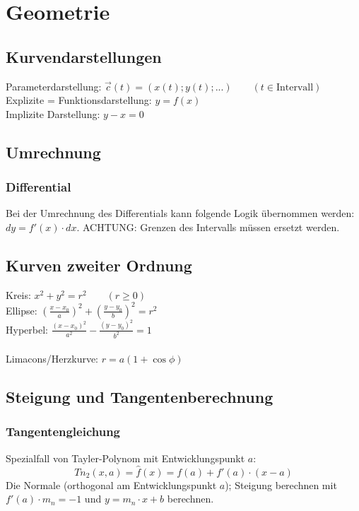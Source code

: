 \section{Geometrie}
\subsection{Kurvendarstellungen}
Parameterdarstellung: $\vec{c}(t) = (x(t); y(t); ...) \qquad (t \in \text{Intervall})$\\
Explizite = Funktionsdarstellung: $y = f(x)$\\
Implizite Darstellung: $y - x = 0$ 


\subsection{Umrechnung}

\subsubsection{Differential}
Bei der Umrechnung des Differentials kann folgende Logik übernommen werden: $dy = f'(x) \cdot dx$. ACHTUNG: Grenzen des Intervalls müssen ersetzt werden.

\subsection{Kurven zweiter Ordnung}
Kreis: $x^2 + y^2 = r^2 \qquad (r \geq 0)$\\
Ellipse: $\left(\frac{x - x_0}{a}\right)^2 + \left(\frac{y - y_0}{b}\right)^2 = r^2$\\
Hyperbel: $\frac{(x - x_0)^2}{a^2} - \frac{(y - y_0)^2}{b^2} = 1$\\
~\\
Limacons/Herzkurve: $r = a(1 + \cos\phi)$

\subsection{Steigung und Tangentenberechnung}
\subsubsection{Tangentengleichung}
Spezialfall von Tayler-Polynom mit Entwicklungspunkt $a$:
\[Tn_2(x, a) = \hat{f}(x) = f(a) + f'(a)\cdot(x - a)\]
Die Normale (orthogonal am Entwicklungspunkt $a$); Steigung berechnen mit $f'(a) \cdot m_n = -1$ und $y = m_n \cdot x + b$ berechnen.

